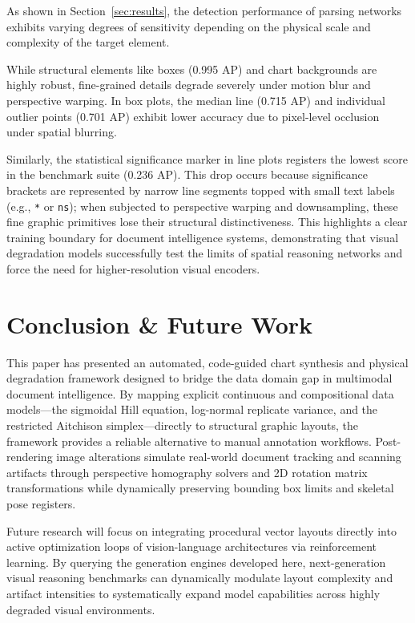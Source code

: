 \documentclass[11pt,twocolumn]{article}
\begin{document}
As shown in Section~\ref{sec:results}, the detection performance of parsing networks exhibits varying degrees of sensitivity depending on the physical scale and complexity of the target element. 

While structural elements like boxes (0.995 AP) and chart backgrounds are highly robust, fine-grained details degrade severely under motion blur and perspective warping. In box plots, the median line (0.715 AP) and individual outlier points (0.701 AP) exhibit lower accuracy due to pixel-level occlusion under spatial blurring. 

Similarly, the statistical significance marker in line plots registers the lowest score in the benchmark suite (0.236 AP). This drop occurs because significance brackets are represented by narrow line segments topped with small text labels (e.g., \texttt{*} or \texttt{ns}); when subjected to perspective warping and downsampling, these fine graphic primitives lose their structural distinctiveness. This highlights a clear training boundary for document intelligence systems, demonstrating that visual degradation models successfully test the limits of spatial reasoning networks and force the need for higher-resolution visual encoders.

\section{Conclusion \& Future Work}\label{sec:conclusion}

This paper has presented an automated, code-guided chart synthesis and physical degradation framework designed to bridge the data domain gap in multimodal document intelligence.
By mapping explicit continuous and compositional data models---the sigmoidal Hill equation, log-normal replicate variance, and the restricted Aitchison simplex---directly to structural graphic layouts, the framework provides a reliable alternative to manual annotation workflows.
Post-rendering image alterations simulate real-world document tracking and scanning artifacts through perspective homography solvers and 2D rotation matrix transformations while dynamically preserving bounding box limits and skeletal pose registers.

Future research will focus on integrating procedural vector layouts directly into active optimization loops of vision-language architectures via reinforcement learning. By querying the generation engines developed here, next-generation visual reasoning benchmarks can dynamically modulate layout complexity and artifact intensities to systematically expand model capabilities across highly degraded visual environments.
\end{document}
